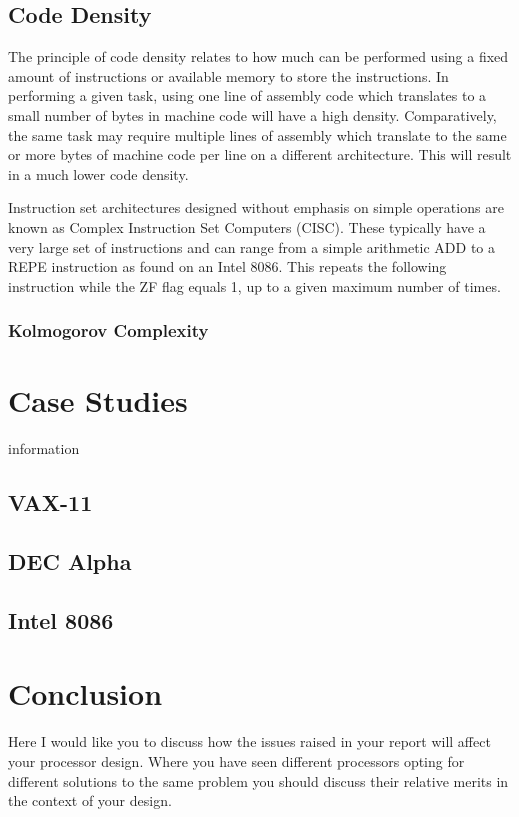 \documentclass[12pt,a4paper]{article}
\begin{document}
\subsection{Code Density}
The principle of code density relates to how much can be performed using a fixed amount of instructions or available memory to store the instructions. In performing a given task, using one line of assembly code which translates to a small number of bytes in machine code will have a high density. Comparatively, the same task may require multiple lines of assembly which translate to the same or more bytes of machine code per line on a different architecture. This will result in a much lower code density. 

Instruction set architectures designed without emphasis on simple operations are known as Complex Instruction Set Computers (CISC). These typically have a very large set of instructions and can range from a simple arithmetic ADD %
to a REPE %
 instruction as found on an Intel 8086. \cite{8086:InstructionSet} 
 This repeats the following instruction while the ZF flag equals 1, up to a given maximum number of times. 

\subsubsection{Kolmogorov Complexity}

\section{Case Studies}
information

\subsection{VAX-11}

\subsection{DEC Alpha}

\subsection{Intel 8086}

\section{Conclusion}
Here I would like you to discuss how the issues raised in your report will affect your processor design. Where you have seen different processors opting for different solutions to the same problem you should discuss their relative merits in the context of your design. 
\end{document}
